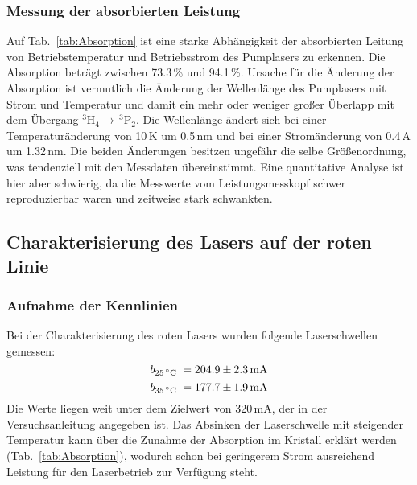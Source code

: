 \subsubsection{Messung der absorbierten Leistung}

Auf Tab.~\ref{tab:Absorption} ist eine starke Abhängigkeit der absorbierten Leitung von
Betriebstemperatur und Betriebsstrom des Pumplasers zu erkennen.
Die Absorption beträgt zwischen 73.3\,\% und 94.1\,\%.
Ursache für die Änderung der Absorption ist vermutlich die Änderung der Wellenlänge des Pumplasers
mit Strom und Temperatur und damit ein mehr oder weniger großer Überlapp mit dem Übergang
$^3$H$_4 \rightarrow\, ^3$P$_2$.
Die Wellenlänge ändert sich bei einer Temperaturänderung von 10\,K um 0.5\,nm und bei einer
Stromänderung von 0.4\,A um 1.32\,nm.
Die beiden Änderungen besitzen ungefähr die selbe Größenordnung,
was tendenziell mit den Messdaten übereinstimmt.
Eine quantitative Analyse ist hier aber schwierig,
da die Messwerte vom Leistungsmesskopf schwer reproduzierbar waren und zeitweise stark schwankten. 


\subsection{Charakterisierung des Lasers auf der roten Linie}

\subsubsection{Aufnahme der Kennlinien}

Bei der Charakterisierung des roten Lasers wurden folgende Laserschwellen gemessen:
\begin{equation*}
b_{25\text{\,$^\circ$C }} = 204.9\pm2.3\,\text{mA}
\end{equation*}
\begin{equation*}
b_{35\text{\,$^\circ$C }} = 177.7\pm1.9\,\text{mA}
\end{equation*}
Die Werte liegen weit unter dem Zielwert von 320\,mA, der in der Versuchsanleitung angegeben ist.
Das Absinken der Laserschwelle mit steigender Temperatur kann über die Zunahme der Absorption im
Kristall erklärt werden (Tab.~\ref{tab:Absorption}),
wodurch schon bei geringerem Strom ausreichend Leistung für den Laserbetrieb zur Verfügung steht.

